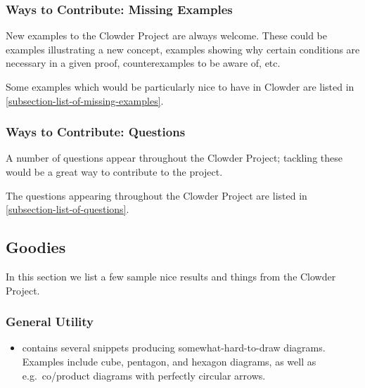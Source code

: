 \subsubsection{Ways to Contribute: Missing Examples}\label{subsubsection-ways-to-contribute-missing-examples}
New examples to the Clowder Project are always welcome. These could be examples illustrating a new concept, examples showing why certain conditions are necessary in a given proof, counterexamples to be aware of, etc.

Some examples which would be particularly nice to have in Clowder are listed in \cref{subsection-list-of-missing-examples}.
\subsubsection{Ways to Contribute: Questions}\label{subsubsection-ways-to-contribute-questions}
A number of questions appear throughout the Clowder Project; tackling these would be a great way to contribute to the project.

The questions appearing throughout the Clowder Project are listed in \cref{subsection-list-of-questions}.
\subsection{Goodies}\label{subsection-goodies}
In this section we list a few sample nice results and things from the Clowder Project.
\subsubsection{General Utility}\label{subsubsection-goodies-general-utility}
\begin{itemize}
    \item {} contains several  snippets producing somewhat-hard-to-draw diagrams. Examples include cube, pentagon, and hexagon diagrams, as well as e.g.\ co/product diagrams with perfectly circular arrows.
\end{itemize}
